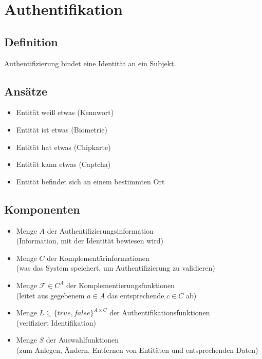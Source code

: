 \documentclass[a4paper,twoside,DIV15,BCOR12mm]{scrbook}
\begin{document}

\chapter{Authentifikation}

\section{Definition}

Authentifizierung bindet eine Identität an ein Subjekt.

\section{Ansätze}

\begin{itemize}
	\item Entität weiß etwas (Kennwort)
	\item Entität ist etwas (Biometrie)
	\item Entität hat etwas (Chipkarte)
	\item Entität kann etwas (Captcha)
	\item Entität befindet sich an einem bestimmten Ort
\end{itemize}

\section{Komponenten}

\begin{itemize}
	\item Menge $A$ der Authentifizierungsinformation\\ (Information, mit der Identität bewiesen wird)
	\item Menge $C$ der Komplementärinformationen\\ (was das System speichert, um Authentifizierung zu validieren)
	\item Menge $\mathcal{F} \in C^A$ der Komplementierungsfunktionen\\ (leitet aus gegebenem $a \in A$ das entsprechende $c \in C$ ab)
	\item Menge $L \subseteq {\{ true, false \}}^{A \times C}$ der Authentifikationsfunktionen\\ (verifiziert Identifikation)
	\item Menge $S$ der Auswahlfunktionen\\ (zum Anlegen, Ändern, Entfernen von Entitäten und entsprechenden Daten)
\end{itemize}
\end{document}
